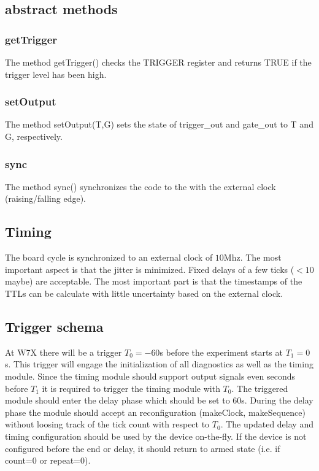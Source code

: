 \documentclass{article}
\begin{document}
\subsection*{abstract methods}
\subsubsection*{getTrigger}
The method getTrigger() checks the TRIGGER register and returns TRUE if the trigger level has been high.
\subsubsection*{setOutput}
The method setOutput(T,G) sets the state of trigger\_out and gate\_out to T and G, respectively.
\subsubsection*{sync}
The method sync() synchronizes the code to the with the external clock (raising/falling edge).

\subsection*{Timing}
The board cycle is synchronized to an external clock of $10$Mhz.
The most important aspect is that the jitter is minimized. Fixed delays of a few ticks ($<10$ maybe) are acceptable. The most important part is that the timestamps of the TTLs can be calculate with little uncertainty based on the external clock.

\subsection*{Trigger schema}
At W7X there will be a trigger $T_0=-60$s before the experiment starts at $T_1=0$s. This trigger will engage the initialization of all diagnostics as well as the timing module. Since the timing module should support output signals even seconds before $T_1$ it is required to trigger the timing module with $T_0$. The triggered module should enter the delay phase which should be set to $60$s. During the delay phase the module should accept an reconfiguration (makeClock, makeSequence) without loosing track of the tick count with respect to $T_0$. The updated delay and timing configuration should be used by the device on-the-fly. If the device is not configured before the end or delay, it should return to armed state (i.e. if count=0 or repeat=0).
\end{document}
